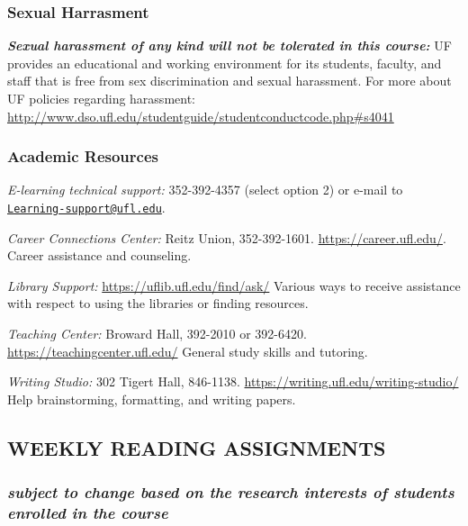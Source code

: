 \documentclass[
  12pt,
]{article}
\begin{document}
\hypertarget{sexual-harrasment}{%
\subsubsection{Sexual Harrasment}\label{sexual-harrasment}}

\textbf{\emph{Sexual harassment of any kind will not be tolerated in
this course:}} UF provides an educational and working environment for
its students, faculty, and staff that is free from sex discrimination
and sexual harassment. For more about UF policies regarding harassment:
\url{http://www.dso.ufl.edu/studentguide/studentconductcode.php\#s4041}

\hypertarget{academic-resources}{%
\subsubsection{\texorpdfstring{\textbf{Academic
Resources}}{Academic Resources}}\label{academic-resources}}

\emph{E-learning technical support: }352-392-4357 (select option 2) or
e-mail to
\href{mailto:Learning-support@ufl.edu}{\nolinkurl{Learning-support@ufl.edu}}.

\emph{Career Connections Center:} Reitz Union, 352-392-1601.
\url{https://career.ufl.edu/}. Career assistance and counseling.

\emph{Library Support:} \url{https://uflib.ufl.edu/find/ask/} Various
ways to receive assistance with respect to using the libraries or
finding resources.

\emph{Teaching Center:} Broward Hall, 392-2010 or 392-6420.
\url{https://teachingcenter.ufl.edu/} General study skills and tutoring.

\emph{Writing Studio:} 302 Tigert Hall, 846-1138.
\url{https://writing.ufl.edu/writing-studio/} Help brainstorming,
formatting, and writing papers.

\newpage

\hypertarget{weekly-reading-assignments}{%
\subsection{WEEKLY READING
ASSIGNMENTS}\label{weekly-reading-assignments}}

\hypertarget{subject-to-change-based-on-the-research-interests-of-students-enrolled-in-the-course}{%
\subsubsection{\texorpdfstring{\emph{subject to change based on the
research interests of students enrolled in the
course}}{subject to change based on the research interests of students enrolled in the course}}\label{subject-to-change-based-on-the-research-interests-of-students-enrolled-in-the-course}}
\end{document}
